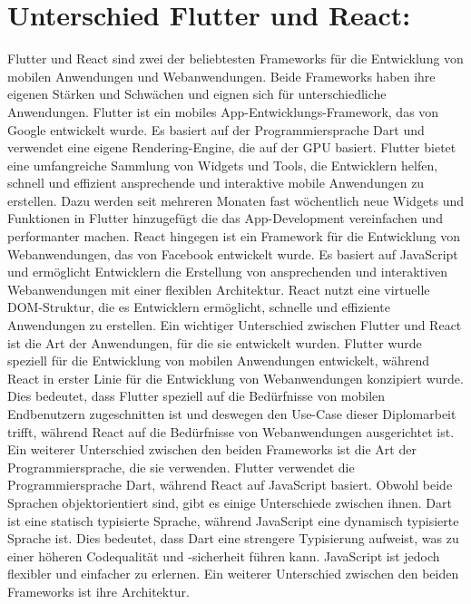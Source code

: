 \section{Unterschied Flutter und React:}
Flutter und React sind zwei der beliebtesten Frameworks für die Entwicklung von mobilen Anwendungen und Webanwendungen. 
Beide Frameworks haben ihre eigenen Stärken und Schwächen und eignen sich für unterschiedliche Anwendungen. 
Flutter ist ein mobiles App-Entwicklungs-Framework, das von Google entwickelt wurde. 
Es basiert auf der Programmiersprache Dart und verwendet eine eigene Rendering-Engine, die auf der GPU basiert. 
Flutter bietet eine umfangreiche Sammlung von Widgets und Tools, die Entwicklern helfen, schnell und effizient ansprechende und interaktive mobile Anwendungen zu erstellen. 
Dazu werden seit mehreren Monaten fast wöchentlich neue Widgets und Funktionen in Flutter hinzugefügt die das App-Development vereinfachen und performanter machen. 
React hingegen ist ein Framework für die Entwicklung von Webanwendungen, das von Facebook entwickelt wurde. Es basiert auf JavaScript und ermöglicht Entwicklern die Erstellung von ansprechenden und interaktiven \newline 
Webanwendungen mit einer flexiblen Architektur. 
React nutzt eine virtuelle DOM-Struktur, die es Entwicklern ermöglicht, schnelle und effiziente Anwendungen zu erstellen. 
Ein wichtiger Unterschied zwischen Flutter und React ist die Art der Anwendungen, für die sie entwickelt wurden. 
Flutter wurde speziell für die Entwicklung von mobilen Anwendungen entwickelt, während React in erster Linie für die Entwicklung von Webanwendungen konzipiert wurde. 
\newline
Dies bedeutet, dass Flutter speziell auf die Bedürfnisse von mobilen Endbenutzern zugeschnitten ist und deswegen den Use-Case dieser Diplomarbeit trifft, während React auf die Bedürfnisse von Webanwendungen ausgerichtet ist.
Ein weiterer Unterschied zwischen den beiden Frameworks ist die Art der Programmiersprache, die sie verwenden. 
Flutter verwendet die Programmiersprache Dart, während React auf JavaScript basiert. 
Obwohl beide Sprachen objektorientiert sind, gibt es einige Unterschiede zwischen ihnen. Dart ist eine statisch typisierte Sprache, während JavaScript eine dynamisch typisierte Sprache ist. 
Dies bedeutet, dass Dart eine strengere Typisierung aufweist, was zu einer höheren Codequalität und -sicherheit führen kann. 
JavaScript ist jedoch flexibler und einfacher zu erlernen.
Ein weiterer Unterschied zwischen den beiden Frameworks ist ihre Architektur. 
